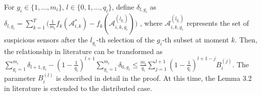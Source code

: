 \begin{lemma}
For $g_i\in\{1,...,m_i\}$, $l\in\{0,1,...,q_i\}$, define $\delta_{l,g_i}$ as $\delta _{l,g_i}=\sum_{k=1}^T{(}\frac{1}{m_i}f_k(\mathcal{A} _{i,k}^{*})-f_k(\mathcal{A} _{i,k,g_i}^{(l_{g_i})}))$
, where $\mathcal{A}_{i,k,g_i}^ {(l_{g_i})}$ represents the set of suspicious sensors after the $l_{g_i}$-th selection of the $g_i$-th subset at moment $k$.
Then, the relationship in literature \cite{Suo2024Security} can be transformed as $\sum^{m_i}_{g_i=1}\delta_{l+1,g_i} - (1-\frac{1}{q_i})^{l+1}\sum^{m_i}_{g_i=1}\delta_{0,g_i}\le \frac{m_i}{q_i}\sum_{j=1}^{l+1}(1-\frac{1}{q_i})^{l+1-j}  B_i^{(j)}$.
The parameter $B_i^{(l)}$ is described in detail in the proof. At this time, the Lemma 3.2 in literature\cite{Suo2024Security} is extended to the distributed case.
\end{lemma}
